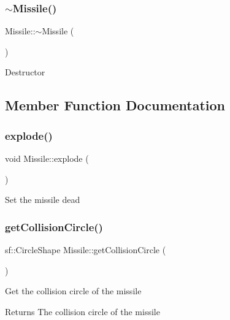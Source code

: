 \subsubsection{\texorpdfstring{$\sim$Missile()}{~Missile()}}
{\footnotesize\ttfamily Missile\+::$\sim$\+Missile (\begin{DoxyParamCaption}{ }\end{DoxyParamCaption})}



Destructor 



\subsection{Member Function Documentation}
\mbox{\label{class_missile_a0f251515e9706d3377e81ef9f5563eb1}} 
\subsubsection{\texorpdfstring{explode()}{explode()}}
{\footnotesize\ttfamily void Missile\+::explode (\begin{DoxyParamCaption}{ }\end{DoxyParamCaption})}



Set the missile dead 

\mbox{\label{class_missile_a3e4feeb61af3c1a333f5d0efa8b5bda5}} 
\subsubsection{\texorpdfstring{getCollisionCircle()}{getCollisionCircle()}}
{\footnotesize\ttfamily sf\+::\+Circle\+Shape Missile\+::get\+Collision\+Circle (\begin{DoxyParamCaption}{ }\end{DoxyParamCaption})}



Get the collision circle of the missile 

\begin{DoxyReturn}{Returns}
The collision circle of the missile
\end{DoxyReturn}
\mbox{\label{class_missile_a66d42fcf18ac58c36a4fee4440d48435}} 
